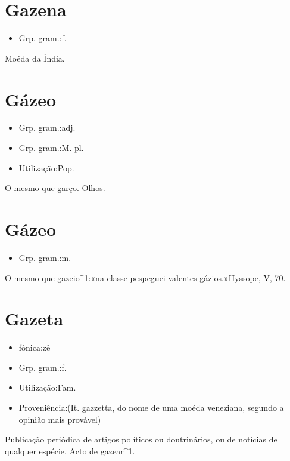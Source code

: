 \section{Gazena}
\begin{itemize}
\item {Grp. gram.:f.}
\end{itemize}
Moéda da Índia.
\section{Gázeo}
\begin{itemize}
\item {Grp. gram.:adj.}
\end{itemize}
\begin{itemize}
\item {Grp. gram.:M. pl.}
\end{itemize}
\begin{itemize}
\item {Utilização:Pop.}
\end{itemize}
O mesmo que \textunderscore garço\textunderscore .
Olhos.
\section{Gázeo}
\begin{itemize}
\item {Grp. gram.:m.}
\end{itemize}
O mesmo que \textunderscore gazeio\textunderscore ^1:«\textunderscore na classe pespeguei valentes gázios.\textunderscore »\textunderscore Hyssope\textunderscore , V, 70.
\section{Gazeta}
\begin{itemize}
\item {fónica:zê}
\end{itemize}
\begin{itemize}
\item {Grp. gram.:f.}
\end{itemize}
\begin{itemize}
\item {Utilização:Fam.}
\end{itemize}
\begin{itemize}
\item {Proveniência:(It. \textunderscore gazzetta\textunderscore , do nome de uma moéda veneziana, segundo a opinião mais provável)}
\end{itemize}
Publicação periódica de artigos políticos ou doutrinários, ou de notícias de qualquer espécie.
Acto de gazear^1.
